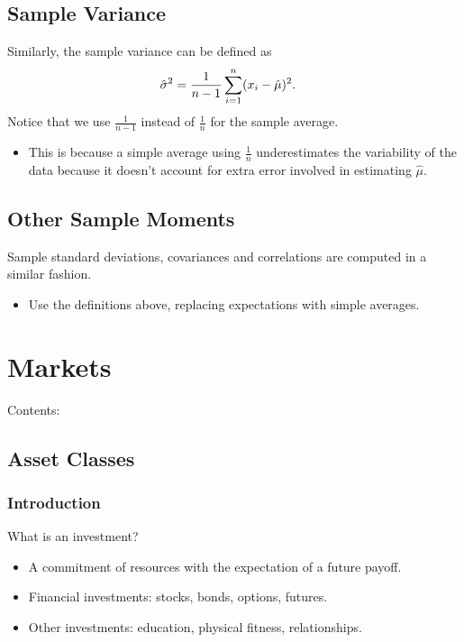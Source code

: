 \documentclass[letterpaper,10pt,english]{sphinxmanual}
\begin{document}
\section{Sample Variance}
\label{probability:sample-variance}
Similarly, the sample variance can be defined as
\begin{gather}
\begin{split}\hat{\sigma}^2 & = \frac{1}{n-1} \sum_{i=1}^n (x_i - \hat{\mu})^2.\end{split}\notag
\end{gather}
Notice that we use $\frac{1}{n-1}$ instead of
$\frac{1}{n}$ for the sample average.
\begin{itemize}
\item {} 
This is because a simple average using $\frac{1}{n}$
underestimates the variability of the data because it doesn't
account for extra error involved in estimating $\hat{\mu}$.

\end{itemize}


\section{Other Sample Moments}
\label{probability:other-sample-moments}
Sample standard deviations, covariances and correlations are
computed in a similar fashion.
\begin{itemize}
\item {} 
Use the definitions above, replacing expectations with simple
averages.

\end{itemize}


\chapter{Markets}
\label{markets:markets}\label{markets::doc}
Contents:


\section{Asset Classes}
\label{assetClasses:asset-classes}\label{assetClasses::doc}

\subsection{Introduction}
\label{assetClasses:introduction}
What is an investment?
\begin{itemize}
\item {} 
A commitment of resources with the expectation of a future payoff.

\end{itemize}
\begin{itemize}
\item {} 
Financial investments: stocks, bonds, options, futures.

\end{itemize}
\begin{itemize}
\item {} 
Other investments: education, physical fitness, relationships.

\end{itemize}
\end{document}
